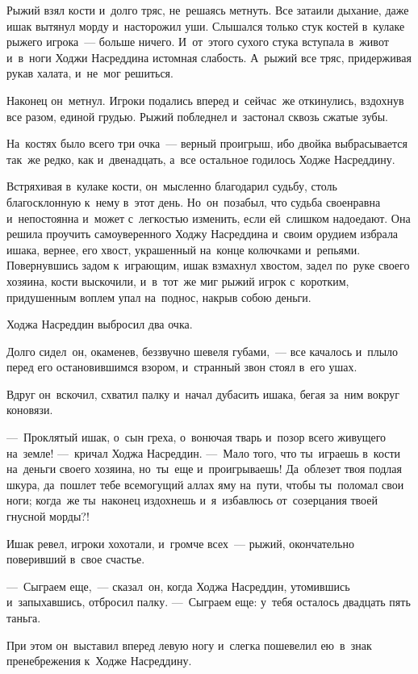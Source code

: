 \documentclass[12pt,a4paper]{book}
\begin{document}
Рыжий взял кости и~долго тряс, не~решаясь метнуть. Все затаили дыхание, даже ишак вытянул морду и~насторожил уши. Слышался только стук костей в~кулаке рыжего игрока~— больше ничего. И~от~этого сухого стука вступала в~живот и~в~ноги Ходжи Насреддина истомная слабость. А~рыжий все тряс, придерживая рукав халата, и~не~мог решиться.

Наконец он~метнул. Игроки подались вперед и~сейчас~же откинулись, вздохнув все разом, единой грудью. Рыжий побледнел и~застонал сквозь сжатые зубы.

На~костях было всего три очка~— верный проигрыш, ибо двойка выбрасывается так~же редко, как и~двенадцать, а~все остальное годилось Ходже Насреддину.

Встряхивая в~кулаке кости, он~мысленно благодарил судьбу, столь благосклонную к~нему в~этот день. Но~он~позабыл, что судьба своенравна и~непостоянна и~может с~легкостью изменить, если ей~слишком надоедают. Она решила проучить самоуверенного Ходжу Насреддина и~своим орудием избрала ишака, вернее, его хвост, украшенный на~конце колючками и~репьями. Повернувшись задом к~играющим, ишак взмахнул хвостом, задел по~руке своего хозяина, кости выскочили, и~в~тот~же миг рыжий игрок с~коротким, придушенным воплем упал на~поднос, накрыв собою деньги.

Ходжа Насреддин выбросил два очка.

Долго сидел~он, окаменев, беззвучно шевеля губами,~— все качалось и~плыло перед его остановившимся взором, и~странный звон стоял в~его ушах.

Вдруг он~вскочил, схватил палку и~начал дубасить ишака, бегая за~ним вокруг коновязи.

—~Проклятый ишак, о~сын греха, о~вонючая тварь и~позор всего живущего на~земле! —~кричал Ходжа Насреддин. —~Мало того, что ты~играешь в~кости на~деньги своего хозяина, но~ты~еще и~проигрываешь! Да~облезет твоя подлая шкура, да~пошлет тебе всемогущий аллах яму на~пути, чтобы ты~поломал свои ноги; когда~же ты~наконец издохнешь и~я~избавлюсь от~созерцания твоей гнусной морды?!

Ишак ревел, игроки хохотали, и~громче всех~— рыжий, окончательно поверивший в~свое счастье.

—~Сыграем еще,~— сказал~он, когда Ходжа Насреддин, утомившись и~запыхавшись, отбросил палку. —~Сыграем еще: у~тебя осталось двадцать пять таньга.

При этом он~выставил вперед левую ногу и~слегка пошевелил ею~в~знак пренебрежения к~Ходже Насреддину.
\end{document}
